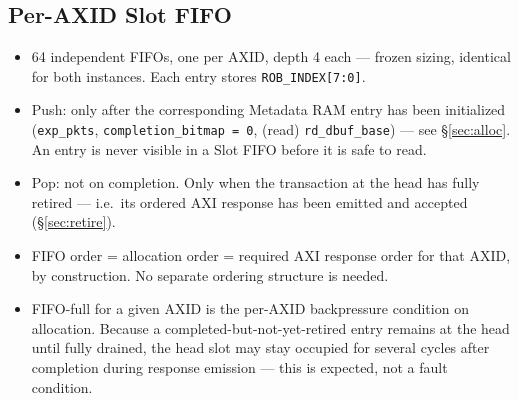 \subsection{Per-AXID Slot FIFO}
\label{sec:fifo}
\begin{itemize}[noitemsep]
  \item 64 independent FIFOs, one per AXID, depth 4 each --- frozen sizing, identical for both instances. Each entry stores \texttt{ROB\_INDEX[7:0]}.
  \item Push: only after the corresponding Metadata RAM entry has been initialized (\texttt{exp\_pkts}, \texttt{completion\_bitmap = 0}, (read) \texttt{rd\_dbuf\_base}) --- see \S\ref{sec:alloc}. An entry is never visible in a Slot FIFO before it is safe to read.
  \item Pop: not on completion. Only when the transaction at the head has fully retired --- i.e.\ its ordered AXI response has been emitted and accepted (\S\ref{sec:retire}).
  \item FIFO order = allocation order = required AXI response order for that AXID, by construction. No separate ordering structure is needed.
  \item FIFO-full for a given AXID is the per-AXID backpressure condition on allocation. Because a completed-but-not-yet-retired entry remains at the head until fully drained, the head slot may stay occupied for several cycles after completion during response emission --- this is expected, not a fault condition.
\end{itemize}

